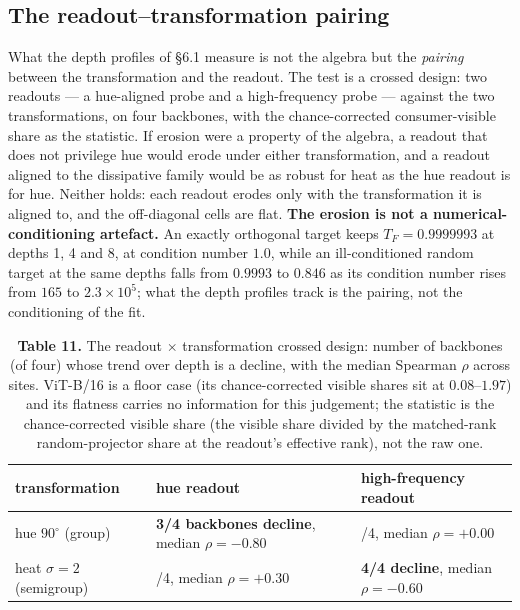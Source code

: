 \subsection{The readout--transformation pairing}

What the depth profiles of \S{}6.1 measure is not the algebra but the \textit{pairing} between the transformation and the readout. The test is a crossed design: two readouts --- a hue-aligned probe and a high-frequency probe --- against the two transformations, on four backbones, with the chance-corrected consumer-visible share as the statistic. If erosion were a property of the algebra, a readout that does not privilege hue would erode under either transformation, and a readout aligned to the dissipative family would be as robust for heat as the hue readout is for hue. Neither holds: each readout erodes only with the transformation it is aligned to, and the off-diagonal cells are flat. \textbf{The erosion is not a numerical-conditioning artefact.} An exactly orthogonal target keeps $T_F=0.9999993$ at depths 1, 4 and 8, at condition number $1.0$, while an ill-conditioned random target at the same depths falls from $0.9993$ to $0.846$ as its condition number rises from $165$ to $2.3\times10^{5}$; what the depth profiles track is the pairing, not the conditioning of the fit.


\begin{table}[t]
\centering
\small
\caption*{\textbf{Table 11.} The readout $\times$ transformation crossed design: number of backbones (of four) whose trend over depth is a decline, with the median Spearman $\rho$ across sites. ViT-B/16 is a floor case (its chance-corrected visible shares sit at $0.08$--$1.97$) and its flatness carries no information for this judgement; the statistic is the chance-corrected visible share (the visible share divided by the matched-rank random-projector share at the readout's effective rank), not the raw one.}
\begin{tabularx}{\textwidth}{@{}>{\raggedright\arraybackslash}X >{\raggedright\arraybackslash}X >{\raggedright\arraybackslash}X@{}}
\toprule
\textbf{transformation} & \textbf{hue readout} & \textbf{high-frequency readout} \\
\midrule
hue $90^\circ$ (group) & \textbf{3/4 backbones decline}, median $\rho=-0.80$ & 2/4, median $\rho=+0.00$ \\
heat $\sigma=2$ (semigroup) & 1/4, median $\rho=+0.30$ & \textbf{4/4 decline}, median $\rho=-0.60$ \\
\bottomrule
\end{tabularx}
\end{table}

